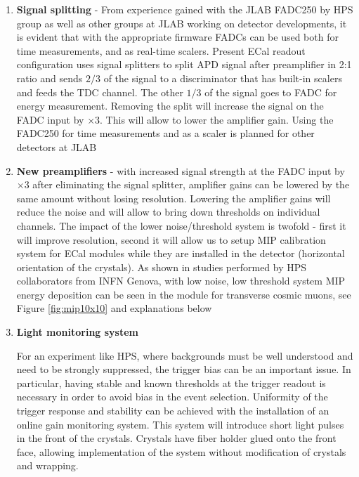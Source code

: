 \begin{enumerate}
\item {\bf Signal splitting} - From experience gained with the JLAB FADC250 by HPS group as well as other groups at JLAB working on detector developments, it is evident that with the appropriate firmware FADCs can be used both for time measurements, and as real-time scalers. Present ECal readout configuration uses signal splitters to split APD signal after preamplifier in 2:1 ratio and sends $2/3$ of the signal to a discriminator that has built-in scalers and feeds the TDC channel. The other $1/3$ of the signal goes to FADC for energy measurement. Removing the split will increase the signal on the FADC input by $\times 3$. This will allow to lower the amplifier gain. Using the FADC250 for time measurements and as a scaler is planned for other detectors at JLAB 
 
\item {\bf New preamplifiers} - with increased signal strength at the FADC input by $\times 3$ after eliminating the signal splitter, amplifier gains can be lowered by the same amount without losing resolution. Lowering the amplifier gains will reduce the noise and will allow to bring down thresholds on individual channels. The impact of the lower noise/threshold system is twofold - first it will improve resolution, second it will allow us to setup MIP calibration system for ECal modules while they are installed in the detector (horizontal orientation of the crystals). As shown in studies performed by HPS collaborators from INFN Genova, with low noise, low threshold system MIP energy deposition can be seen in the module for transverse cosmic muons, see Figure \ref{fig:mip10x10} and explanations below

\item {\bf Light monitoring system}

For an experiment like HPS, where backgrounds must be well understood and need to be strongly suppressed, the trigger bias can be an important issue. In particular, having stable and known thresholds at the trigger readout is necessary in order to avoid  bias in the event selection. Uniformity of the trigger response and stability can be achieved with the installation of an online gain monitoring system. This system will introduce short light pulses in the front of the crystals. Crystals have fiber holder glued onto the  front face, allowing implementation of the system without modification of crystals and wrapping. 


\end{enumerate}
